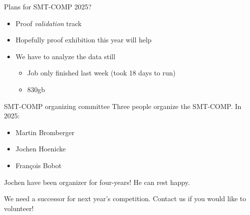 \documentclass[table]{beamer}
\newcommand\vitem{\vfill\item}
\begin{document}
\begin{frame}{Plans for SMT-COMP 2025?}
  \begin{itemize}
    \item Proof \textit{validation} track

      \vitem Hopefully proof exhibition this year will help

      \vitem We have to analyze the data still
      \begin{itemize}
        \item Job only finished last week (took 18 days to run)
        \item 830gb
      \end{itemize}

  \end{itemize}


\end{frame}

\begin{frame}{SMT-COMP organizing committee}
  Three people organize the SMT-COMP.  In 2025:
  \begin{itemize}
  \item Martin Bromberger
  \item Jochen Hoenicke
  \item Fran\c{c}ois Bobot
  \end{itemize}

  Jochen have been organizer for four-years! He can rest happy.
  \bigskip

  We need a successor for next year's competition.
  Contact us if you would like to volunteer!
\end{frame}
\end{document}
